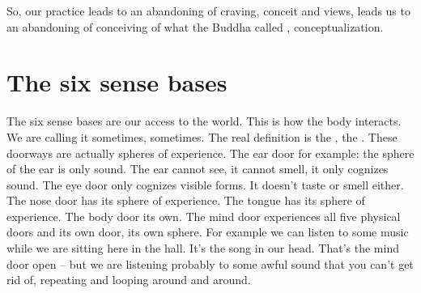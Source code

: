 \documentclass[letterpaper,10pt,english]{sphinxmanual}
\begin{document}
\sphinxAtStartPar
So, our practice leads to an abandoning of craving, conceit and views,
leads us to an abandoning of conceiving of what the Buddha called
,
conceptualization.


\section{The six sense bases}
\label{\detokenize{5-b:the-six-sense-bases}}
\sphinxAtStartPar
The six sense bases are our access to the world. This is how the body
interacts. We are calling it
sometimes,
sometimes. The real definition is the
, the
. These
doorways are actually spheres of experience. The ear door for example: the
sphere of the ear is only sound. The ear cannot see, it cannot smell, it only
cognizes sound. The eye door only cognizes visible forms. It doesn’t taste
or smell either. The nose door has its sphere of experience. The tongue has
its sphere of experience. The body door its own. The mind door experiences
all  five  physical  doors  and  its  own  door,  its  own  sphere.  For  example  we
can listen to some music while we are sitting here in the hall. It’s the song
in our head. That’s the mind door open – but we are listening probably to
some  awful  sound  that  you  can’t  get  rid  of,  repeating  and  looping  around
and around.
\end{document}
